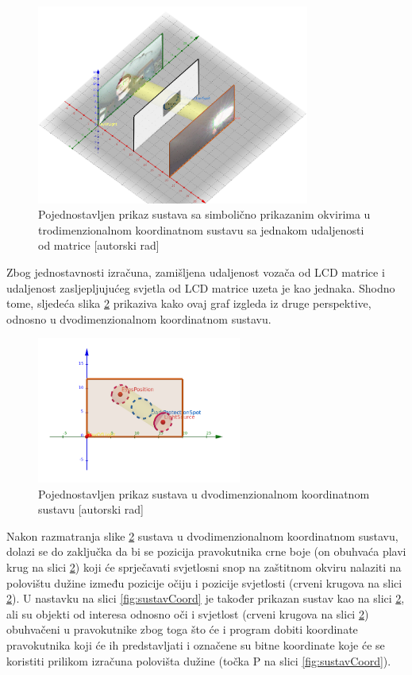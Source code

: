 \documentclass{foi}
\begin{document}
\begin{figure}[h!]
    \centering
    \includegraphics[width=0.8\textwidth]{slike/sustav6}
    \caption{Pojednostavljen prikaz sustava sa simbolično prikazanim okvirima u trodimenzionalnom koordinatnom sustavu sa jednakom udaljenosti od matrice [autorski rad]}
    \label{fig:sustav6}
\end{figure}

Zbog jednostavnosti izračuna, zamišljena udaljenost vozača od LCD matrice i udaljenost zasljepljujućeg svjetla od LCD matrice uzeta je kao jednaka. Shodno tome, sljedeća slika \ref{fig:sustav4} prikaziva kako ovaj graf izgleda iz druge perspektive, odnosno u dvodimenzionalnom koordinatnom sustavu.

\begin{figure}[h!]
    \centering
    \includegraphics[width=0.6\textwidth]{slike/sustav4}
    \caption{Pojednostavljen prikaz sustava u dvodimenzionalnom koordinatnom sustavu [autorski rad]}
    \label{fig:sustav4}
\end{figure}

\newpage
Nakon razmatranja slike \ref{fig:sustav4} sustava u dvodimenzionalnom koordinatnom sustavu, dolazi se do zaključka da bi se pozicija pravokutnika crne boje (on obuhvaća plavi krug na slici \ref{fig:sustav4}) koji će sprječavati svjetlosni snop na zaštitnom okviru nalaziti na polovištu dužine između pozicije očiju i pozicije svjetlosti (crveni krugova na slici \ref{fig:sustav4}). U nastavku na slici \ref{fig:sustavCoord} je također prikazan sustav kao na slici \ref{fig:sustav4}, ali su objekti od interesa odnosno oči i svjetlost (crveni krugova na slici \ref{fig:sustav4}) obuhvačeni u pravokutnike zbog toga što će i program dobiti koordinate pravokutnika koji će ih predstavljati i označene su bitne koordinate koje će se koristiti prilikom izračuna polovišta dužine (točka P na slici \ref{fig:sustavCoord}).
\end{document}
